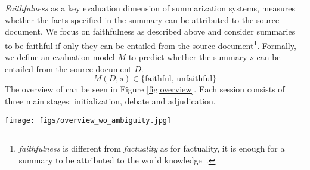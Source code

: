 \section{\method}

\textit{Faithfulness} as a key evaluation dimension of summarization systems, measures whether the facts specified in the summary can be attributed to the source document. 
We focus on faithfulness as described above and consider summaries to be faithful if only they can be entailed from the source document\footnote{\textit{faithfulness} is different from \textit{factuality} as for factuality, it is enough for a summary to be attributed to the world knowledge~\cite{maynez-etal-2020-faithfulness}.}.
% 
Formally, we define an evaluation model $M$ to predict whether the summary $s$ can be entailed from the source document $D$.
\[M(D, s) \in \{\text{faithful, unfaithful}\}\]
The overview of \method can be seen in Figure \ref{fig:overview}. Each \method session consists of three main stages: initialization, debate and adjudication.
\begin{figure*}
    \centering
    \texttt{[image: figs/overview\_wo\_ambiguity.jpg]}
    \vspace*{-0.7cm}
    \caption{Overview of \method, our proposed framework for automatic faithfulness evaluation. Each debate session consists of three stages: 1) \textit{stance initialization}, in which agents are assigned a belief of the summary faithfulness (faithful or unfaithful), 2) \textit{debate}, where evaluator agents engage in multiple rounds of debate to persuade each other of whether the summary is faithful or not, and 3) \textit{adjudication}, where based on the arguments from the debate, the final label is assigned to the summary. \method can have simultaneous debate sessions.}
    \label{fig:overview}
    \vspace*{-0.2cm}
\end{figure*}


